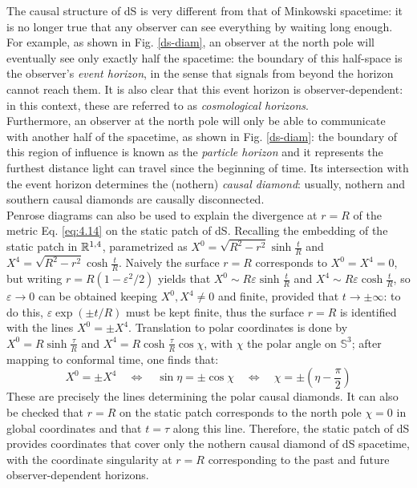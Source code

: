 The causal structure of dS is very different from that of Minkowski spacetime: it is no longer true that any observer can see everything by waiting long enough. For example, as shown in Fig. \ref{ds-diam}, an observer at the north pole will eventually see only exactly half the spacetime: the boundary of this half-space is the observer's \textit{event horizon}, in the sense that signals from beyond the horizon cannot reach them. It is also clear that this event horizon is observer-dependent: in this context, these are referred to as \textit{cosmological horizons}.\\
Furthermore, an observer at the north pole will only be able to communicate with another half of the spacetime, as shown in Fig. \ref{ds-diam}: the boundary of this region of influence is known as the \textit{particle horizon} and it represents the furthest distance light can travel since the beginning of time. Its intersection with the event horizon determines the (nothern) \textit{causal diamond}: usually, nothern and southern causal diamonds are causally disconnected.\\
Penrose diagrams can also be used to explain the divergence at $ r = R $ of the metric Eq. \ref{eq:4.14} on the static patch of dS. Recalling the embedding of the static patch in $ \mathbb{R}^{1,4} $, parametrized as $ X^0 = \sqrt{R^2 - r^2} \sinh \frac{t}{R} $ and $ X^4 = \sqrt{R^2 - r^2} \cosh \frac{t}{R} $. Naively the surface $ r = R $ corresponds to $ X^0 = X^4 = 0 $, but writing $ r = R ( 1 - \varepsilon^2 / 2) $ yields that $ X^0 \sim R \varepsilon \sinh \frac{t}{R} $ and $ X^4 \sim R \varepsilon \cosh \frac{t}{R} $, so $ \varepsilon \rightarrow 0 $ can be obtained keeping $ X^0, X^4 \neq 0 $ and finite, provided that $ t \rightarrow \pm \infty $: to do this, $ \varepsilon \exp (\pm t / R) $ must be kept finite, thus the surface $ r = R $ is identified with the lines $ X^0 = \pm X^4 $. Translation to polar coordinates is done by $ X^0 = R \sinh \frac{\tau}{R} $ and $ X^4 = R \cosh \frac{\tau}{R} \cos \chi $, with $ \chi $ the polar angle on $ \mathbb{S}^3 $; after mapping to conformal time, one finds that:
\begin{equation*}
  X^0 = \pm X^4
  \quad \Leftrightarrow \quad
  \sin \eta = \pm \cos \chi
  \quad \Leftrightarrow \quad
  \chi = \pm \left( \eta - \frac{\pi}{2} \right)
\end{equation*}
These are precisely the lines determining the polar causal diamonds. It can also be checked that $ r = R $ on the static patch corresponds to the north pole $ \chi = 0 $ in global coordinates and that $ t = \tau $ along this line. Therefore, the static patch of dS provides coordinates that cover only the nothern causal diamond of dS spacetime, with the coordinate singularity at $ r = R $ corresponding to the past and future observer-dependent horizons.

